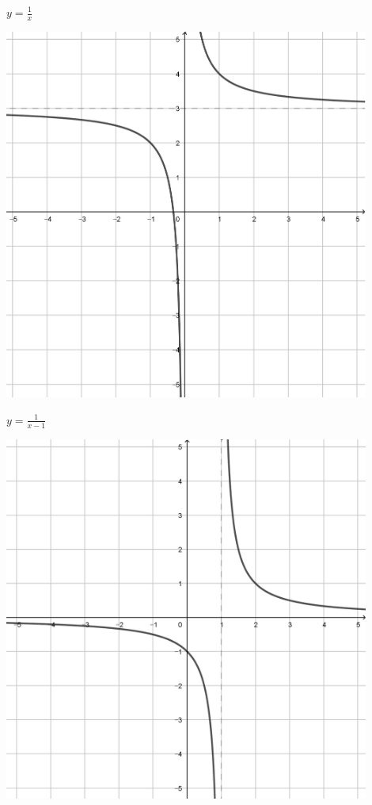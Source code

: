 \documentclass[a4paper]{oblivoir}
\begin{document}
\clearpage
\begin{minipage}{0.45\textwidth}\centering
\(y=\frac1x\)
\par\bigskip\includegraphics[width=0.9\textwidth]{img/4_rational_10}
\end{minipage}
\begin{minipage}{0.45\textwidth}\centering
\(y=\frac1{x-1}\)
\par\bigskip\includegraphics[width=0.9\textwidth]{img/4_rational_11}
\end{minipage}\bigskip\bigskip\par
\end{document}
